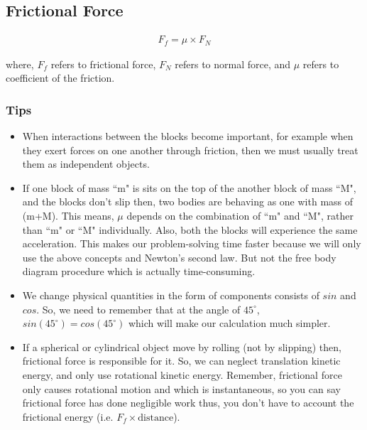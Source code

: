 \documentclass[12pt,a4paper]{article}
\begin{document}
\subsection{Frictional Force}

\begin{align}
F_{f} = \mu \times F_{N}
\end{align}

where, $F_{f}$ refers to frictional force, $F_{N}$ refers to normal force, and $\mu$ refers to coefficient of the friction.

\subsubsection*{Tips}

\begin{itemize}
\item When interactions between the blocks become important, for example when they exert forces on one another through friction, then we must usually treat them as independent objects.

\item If one block of mass ``m" is sits on the top of the another block of mass ``M", and the blocks don't slip then, two bodies are behaving as one with mass of (m+M).  This means, $\mu$ depends on the combination of ``m" and ``M", rather than ``m" or ``M" individually. Also, both the blocks will experience the same acceleration. This makes our problem-solving time faster because we will only use the above concepts and Newton's second law. But not the free body diagram procedure which is actually time-consuming.

\item We change physical quantities in the form of components consists of $sin$ and $cos$. So, we need to remember that at the angle of $45^{\circ}$, $sin(45^{\circ}) = cos(45^{\circ})$ which will make our calculation much simpler.

\item If a spherical or cylindrical object move by rolling (not by slipping) then, frictional force is responsible for it. So, we can neglect translation kinetic energy, and only use rotational kinetic energy. Remember, frictional force only causes rotational motion and which is instantaneous, so you can say frictional force has done negligible work thus, you don't have to account the frictional energy (i.e. $F_{f} \times \text{distance}$).


\end{itemize}
\end{document}
